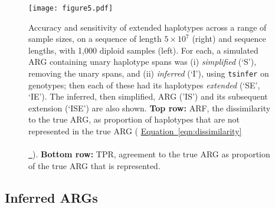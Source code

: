 \documentclass[10pt,twoside,lineno]{gsajnl}
\newcommand{\tsinfer}{\texttt{tsinfer}}
\newcommand*{\eqnref}[2][]{%
	\hyperref[{#2}]{%
		Equation~\ref*{#2}%
		\ifx\\#1\\%
		\else
		\,#1%
		\fi
	}%
}
\begin{document}
\begin{figure}[!hbt]
	\begin{center}
        \texttt{[image: figure5.pdf]}
	\end{center}
    \caption{
        Accuracy and sensitivity of extended haplotypes
        across a range of sample sizes, on a sequence of length $5\times10^7$ (right)
        and sequence lengths, with 1,000 diploid samples (left).
        For each, a simulated ARG containing unary haplotype spans
        was (i) \emph{simplified} (`S'), removing the unary spans,
        and (ii) \emph{inferred} (`I'), using \tsinfer{} on genotypes;
        then each of these had its haplotypes \emph{extended} (`SE', `IE').
        The inferred, then simplified, ARG ('IS') and its subsequent extension (`ISE') are also shown.
        \textbf{Top row:} ARF, the dissimilarity to the true ARG,
        as proportion of haplotypes that are not represented in the true ARG
        (\eqnref{eqn:dissimilarity}).
        \textbf{Bottom row:} TPR, agreement to the true ARG
        as proportion of the true ARG that is represented.
        }     
    \label{fig:dissimilarity}
\end{figure}


\subsection{Inferred ARGs}
\end{document}
